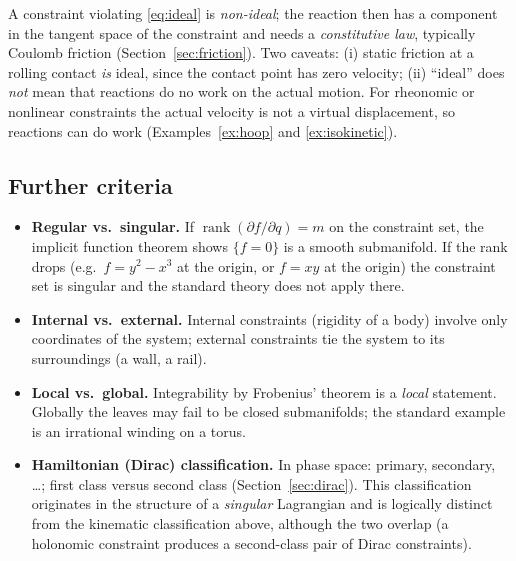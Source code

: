 \documentclass[11pt,a4paper]{article}
\theoremstyle{definition}
\theoremstyle{plain}
\theoremstyle{remark}
\DeclareMathOperator{\rank}{rank}
\begin{document}
A constraint violating \eqref{eq:ideal} is \emph{non-ideal}; the reaction then has a
component in the tangent space of the constraint and needs a \emph{constitutive law},
typically Coulomb friction (Section~\ref{sec:friction}). Two caveats:
(i) static friction at a rolling contact \emph{is} ideal, since the contact point has
zero velocity; (ii) ``ideal'' does \emph{not} mean that reactions do no work on the actual
motion. For rheonomic or nonlinear constraints the actual velocity is not a virtual
displacement, so reactions can do work (Examples~\ref{ex:hoop} and \ref{ex:isokinetic}).

\subsection{Further criteria}
\begin{itemize}[leftmargin=1.2em]
\item \textbf{Regular vs.\ singular.} If $\rank(\partial f/\partial q)=m$ on the constraint
  set, the implicit function theorem shows $\{f=0\}$ is a smooth submanifold. If the rank
  drops (e.g.\ $f=y^2-x^3$ at the origin, or $f=xy$ at the origin) the constraint set is
  singular and the standard theory does not apply there.
\item \textbf{Internal vs.\ external.} Internal constraints (rigidity of a body) involve only
  coordinates of the system; external constraints tie the system to its surroundings
  (a wall, a rail).
\item \textbf{Local vs.\ global.} Integrability by Frobenius' theorem is a \emph{local}
  statement. Globally the leaves may fail to be closed submanifolds; the standard example is
  an irrational winding on a torus.
\item \textbf{Hamiltonian (Dirac) classification.} In phase space: primary, secondary,
  \dots; first class versus second class (Section~\ref{sec:dirac}). This classification
  originates in the structure of a \emph{singular} Lagrangian and is logically distinct
  from the kinematic classification above, although the two overlap (a holonomic
  constraint produces a second-class pair of Dirac constraints).
\end{itemize}
\end{document}
